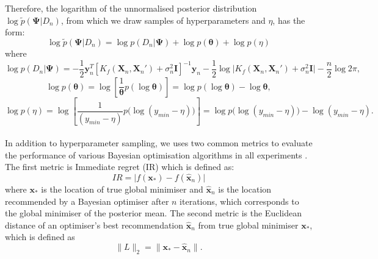\documentclass[a4paper,11pt]{report}
\begin{document}
\noindent
Therefore, the logarithm of the unnormalised posterior distribution $\log \tilde p(\boldsymbol{\Psi} \vert D_n) $, from which we draw samples of hyperparameters and $\eta$, has the form: 
 \[ \log \tilde p(\boldsymbol{\Psi} \vert D_n) = \log p( D_n \vert \boldsymbol{\Psi} ) + \log p (\boldsymbol{\theta}) + \log p(\eta) \]
 where 
\[ \log p( D_n \vert \boldsymbol{\Psi} ) = -\frac{1}{2} \mathbf{y}_n^T [K_{f} (\mathbf{X}_n,\mathbf{X}_n') + \sigma_{n}^2 \mathbf{I} ]^{-1} \mathbf{y}_n - \frac{1}{2} \log \vert  K_{f} (\mathbf{X}_n,\mathbf{X}_n') + \sigma_{n}^2 \mathbf{I}\vert - \frac{n}{2} \log 2\pi,  \] 
 \[ \log p (\boldsymbol{\theta}) = \log \left[ \frac{1} {\boldsymbol{\theta}} p( \log \boldsymbol{\theta}) \right ] = \log p( \log \boldsymbol{\theta}) - \log \boldsymbol{\theta} , \]
 \[ \log p(\eta) = \log \left [ \frac{1} { (y_{min}- \eta)} p \big( \log (y_{min}- \eta) \big) \right ] = \log p \big( \log (y_{min}- \eta) \big) - \log (y_{min}- \eta)  . \]
\\
\noindent
In addition to hyperparameter sampling, we uses two common metrics to evaluate the performance of various Bayesian optimisation algorithms in all experiments \cite{hennig2012entropy}. The first metric is Immediate regret (IR) which is defined as:
\begin{equation} \label {IR}
IR=\vert f(\mathbf{x}_{*})- f(\hat{\mathbf{x}}_n)\vert 
\end{equation}
where $\mathbf{x}_{*}$ is the location of true global minimiser and $\hat{\mathbf{x}}_n$ is the location recommended by a Bayesian optimiser after $n$ iterations, which corresponds to the global minimiser of the posterior mean\cite{hernandez2014predictive}. The second metric is the Euclidean distance of an optimiser's best recommendation $\hat{\mathbf{x}}_n$ from true global minimiser $\mathbf{x}_{*}$, which is defined as
\begin{equation} \label{Euclidean}
\| L\| _{2} =\| \mathbf{x}_{*} - \hat{\mathbf{x}}_{n} \| . 
\end{equation} 
\end{document}
